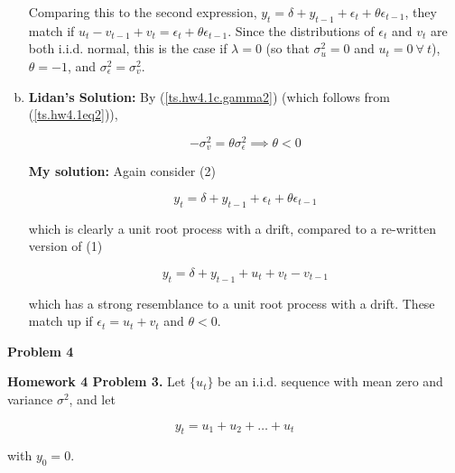 \begin{enumerate}[(a)]
Comparing this to the second expression, \(y_t = \delta + y_{t-1} + \epsilon_t + \theta \epsilon_{t-1}\), they match if \( u_t - v_{t-1} + v_t =  \epsilon_t + \theta \epsilon_{t-1}\). Since the distributions of \(\epsilon_t\) and \(v_t\) are both i.i.d. normal, this is the case if \(\lambda = 0\) (so that \(\sigma_u^2 = 0\) and \(u_t = 0 \ \forall \ t\)), \(\theta = -1\), and \(\sigma_\epsilon^2 = \sigma_v^2\).

\item 

\textbf{Lidan's Solution:} By (\ref{ts.hw4.1c.gamma2}) (which follows from (\ref{ts.hw4.1eq2})),

\[
-\sigma_v^2 = \theta \sigma_\epsilon^2 \implies \theta < 0
\]

\textbf{My solution:} Again consider (2)

\[
y_t = \delta + y_{t-1} +  \epsilon_t + \theta \epsilon_{t-1}
\]

which is clearly a unit root process with a drift, compared to a re-written version of (1)

\[
y_t =  \delta + y_{t-1}  + u_t + v_t  - v_{t-1}
\]

which has a strong resemblance to a unit root process with a drift. These match up if \(\epsilon_t  = u_t + v_t\) and \(\theta < 0\). 

\end{enumerate}


\textbf{Problem 4}




\textbf{Homework 4 Problem 3.} Let \(\{u_t\}\) be an i.i.d. sequence with mean zero and variance \(\sigma^2\), and let

\[
y_t = u_1 + u_2 + \ldots + u_t
\]

with \(y_0 =0\).

